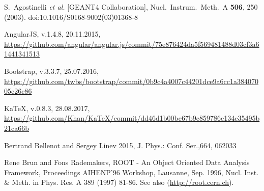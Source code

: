 \begin{thebibliography}{}
%
%
S.~Agostinelli {\it et al.} [GEANT4 Collaboration],
  Nucl.\ Instrum.\ Meth.\ A {\bf 506}, 250 (2003).
  doi:10.1016/S0168-9002(03)01368-8

AngularJS, v.1.4.8, 20.11.2015, \url{https://github.com/angular/angular.js/commit/75e876424da5f569481488d03cf3a61441341513}

Bootstrap, v.3.3.7, 25.07.2016, \url{https://github.com/twbs/bootstrap/commit/0b9c4a4007c44201dce9a6cc1a38407005c26c86}

KaTeX, v.0.8.3, 28.08.2017,
\url{https://github.com/Khan/KaTeX/commit/dd46d1b00be67b9c859786e134c35495b21ca66b}

Bertrand Bellenot and Sergey Linev 2015, J. Phys.: Conf. Ser.,664,  062033

    Rene Brun and Fons Rademakers,
    ROOT - An Object Oriented Data Analysis Framework,
    Proceedings AIHENP'96 Workshop, Lausanne, Sep. 1996, Nucl. Inst. \& Meth. in Phys. Res. A 389 (1997) 81-86. See also (\url{http://root.cern.ch}).

\end{thebibliography}